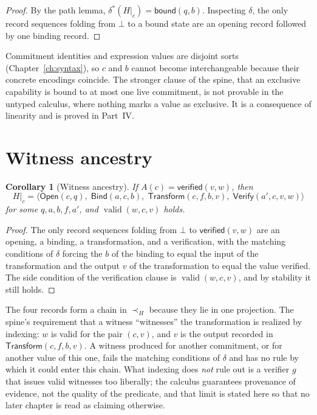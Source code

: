 \documentclass[11pt,openany]{book}
\newtheorem{corollary}[theorem]{Corollary}
\theoremstyle{remark}
\newcommand{\Bind}{\mathsf{Bind}}
\newcommand{\Transform}{\mathsf{Transform}}
\newcommand{\Verify}{\mathsf{Verify}}
\newcommand{\valid}{\operatorname{valid}}
\begin{document}
\begin{proof}
By the path lemma, $\delta^{*}(H|_c)=\mathsf{bound}(q,b)$. Inspecting
$\delta$, the only record sequences folding from $\bot$ to a bound state
are an opening record followed by one binding record.
\end{proof}

Commitment identities and expression values are disjoint sorts
(Chapter~\ref{ch:syntax}), so $c$ and $b$ cannot become interchangeable
because their concrete encodings coincide. The stronger clause of the
spine, that an exclusive capability is bound to at most one live
commitment, is not provable in the untyped calculus, where nothing marks a
value as exclusive. It is a consequence of linearity and is proved in
Part~IV.

\section{Witness ancestry}

\begin{corollary}[Witness ancestry]\label{cor:witness}
If $A(c)=\mathsf{verified}(v,w)$, then
\[
H|_c=\langle \mathsf{Open}(c,q),\;\Bind(a,c,b),\;
\Transform(c,f,b,v),\;\Verify(a',c,v,w)\rangle
\]
for some $q,a,b,f,a'$, and $\valid(w,c,v)$ holds.
\end{corollary}

\begin{proof}
The only record sequences folding from $\bot$ to $\mathsf{verified}(v,w)$
are an opening, a binding, a transformation, and a verification, with the
matching conditions of $\delta$ forcing the $b$ of the binding to equal
the input of the transformation and the output $v$ of the transformation
to equal the value verified. The side condition of the verification clause
is $\valid(w,c,v)$, and by stability it still holds.
\end{proof}

The four records form a chain in $\prec_H$ because they lie in one
projection. The spine's requirement that a witness ``witnesses'' the
transformation is realized by indexing: $w$ is valid for the pair $(c,v)$,
and $v$ is the output recorded in $\Transform(c,f,b,v)$. A witness produced
for another commitment, or for another value of this one, fails the
matching conditions of $\delta$ and has no rule by which it could enter
this chain. What indexing does \emph{not} rule out is a verifier $g$ that
issues valid witnesses too liberally; the calculus guarantees provenance
of evidence, not the quality of the predicate, and that limit is stated
here so that no later chapter is read as claiming otherwise.
\end{document}
